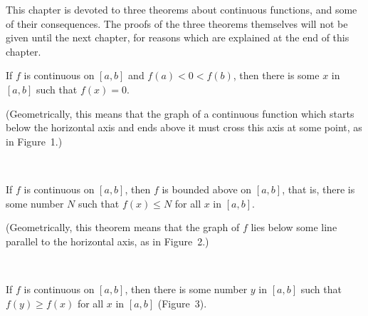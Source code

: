 

This chapter is devoted to three theorems about continuous functions, and some
of their consequences. The proofs of the three theorems themselves will not be
given until the next chapter, for reasons which are explained at the end of this
chapter.

\begin{theorem}
If $f$ is continuous on $[a,b]$ and $f(a)<0<f(b)$, then there is some $x$ in
$[a,b]$ such that $f(x)=0$.
\end{theorem}

(Geometrically, this means that the graph of a continuous function which starts
below the horizontal axis and ends above it must cross this axis at some point,
as in Figure~1.)
\begin{center}
\\[0.6em]
\end{center}

\begin{theorem}
If $f$ is continuous on $[a,b]$, then $f$ is bounded above on $[a,b]$, that is,
there is some number $N$ such that $f(x)\leq N$ for all $x$ in $[a,b]$.
\end{theorem}

(Geometrically, this theorem means that the graph of $f$ lies below some line
parallel to the horizontal axis, as in Figure~2.)
\begin{center}
\\[0.6em]
\end{center}

\begin{theorem}
If $f$ is continuous on $[a,b]$, then there is some number $y$ in $[a,b]$ such
that $f(y)\geq f(x)$ for all $x$ in $[a,b]$ (Figure~3).
\end{theorem}
\begin{center}
\\[0.6em]
\end{center}

